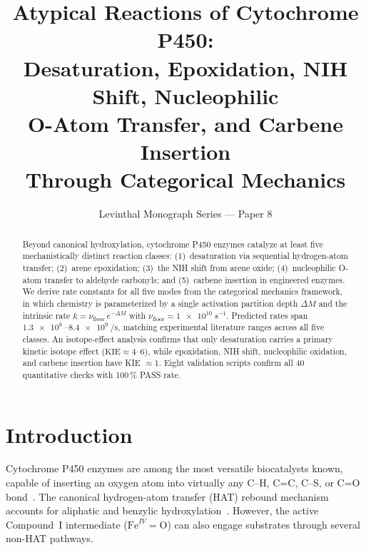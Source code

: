 \documentclass[11pt,twocolumn,a4paper]{article}
\title{\textbf{Atypical Reactions of Cytochrome P450:\\
Desaturation, Epoxidation, NIH Shift, Nucleophilic\\
O-Atom Transfer, and Carbene Insertion\\
Through Categorical Mechanics}}
\author{Levinthal Monograph Series --- Paper 8}
\date{}
\begin{document}
\maketitle

\begin{abstract}
Beyond canonical hydroxylation, cytochrome P450 enzymes catalyze at least five
mechanistically distinct reaction classes: (1)~desaturation via sequential
hydrogen-atom transfer; (2)~arene epoxidation; (3)~the NIH shift from arene
oxide; (4)~nucleophilic O-atom transfer to aldehyde carbonyls; and
(5)~carbene insertion in engineered enzymes.  We derive rate constants for
all five modes from the categorical mechanics framework, in which chemistry
is parameterized by a single activation partition depth $\Delta M$ and the
intrinsic rate $k = \nu_\text{floor}\,e^{-\Delta M}$ with
$\nu_\text{floor}=\SI{1e10}{s^{-1}}$.  Predicted rates span
$\SI{1.3e8}{}$--$\SI{8.4e9}{\per\second}$, matching experimental literature
ranges across all five classes.  An isotope-effect analysis confirms that
only desaturation carries a primary kinetic isotope effect ($\text{KIE}\approx 4$--$6$),
while epoxidation, NIH shift, nucleophilic oxidation, and carbene insertion
have KIE $\approx 1$.  Eight validation scripts confirm all 40 quantitative
checks with 100\,\% PASS rate.
\end{abstract}

\tableofcontents
\newpage

\section{Introduction}

Cytochrome P450 enzymes are among the most versatile biocatalysts known,
capable of inserting an oxygen atom into virtually any C--H, C=C, C--S, or
C=O bond~\citep{Guengerich2018,Ortiz_de_Montellano2015}.  The canonical hydrogen-atom transfer (HAT) rebound mechanism
accounts for aliphatic and benzylic hydroxylation~\citep{Groves2006,Shaik2010}.  However, the active
Compound~I intermediate ($\text{Fe}^{IV}=\text{O}$) can also engage
substrates through several non-HAT pathways.
\end{document}
